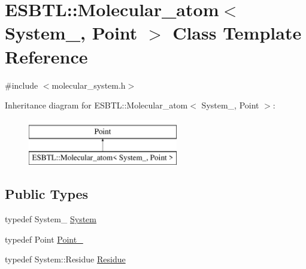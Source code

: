 \hypertarget{classESBTL_1_1Molecular__atom}{}\section{E\+S\+B\+TL\+:\+:Molecular\+\_\+atom$<$ System\+\_\+, Point $>$ Class Template Reference}
\label{classESBTL_1_1Molecular__atom}


{\ttfamily \#include $<$molecular\+\_\+system.\+h$>$}

Inheritance diagram for E\+S\+B\+TL\+:\+:Molecular\+\_\+atom$<$ System\+\_\+, Point $>$\+:\begin{figure}[H]
\begin{center}
\leavevmode
\includegraphics[height=2.000000cm]{classESBTL_1_1Molecular__atom}
\end{center}
\end{figure}
\subsection*{Public Types}
\begin{DoxyCompactItemize}
\item 
typedef System\+\_\+ \hyperlink{classESBTL_1_1Molecular__atom_a58dc16da7581815290469a77906ff8f2}{System}
\item 
typedef Point \hyperlink{classESBTL_1_1Molecular__atom_a7803bad1194caa2c54a055a1e8f0c3fb}{Point\+\_}
\item 
typedef System\+::\+Residue \hyperlink{classESBTL_1_1Molecular__atom_a24e68b497c2f43b77ca43be36af7bcd1}{Residue}
\end{DoxyCompactItemize}
